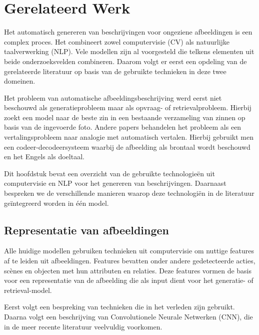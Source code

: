 \chapter{Gerelateerd Werk}
\label{hoofdstuk:related}
Het automatisch genereren van beschrijvingen voor ongeziene afbeeldingen is een complex proces. Het combineert zowel computervisie (CV) als natuurlijke taalverwerking (NLP). Vele modellen zijn al voorgesteld die telkens elementen uit beide onderzoeksvelden combineren. Daarom volgt er eerst een opdeling van de gerelateerde literatuur op basis van de gebruikte technieken in deze twee domeinen. 

Het probleem van automatische afbeeldingsbeschrijving werd eerst niet beschouwd als generatieprobleem maar als opvraag- of retrievalprobleem. Hierbij zoekt een model naar de beste zin in een bestaande verzameling van zinnen op basis van de ingevoerde foto\cite{Hodosh2013}. Andere papers behandelen het probleem als een vertalingsprobleem naar analogie met automatisch vertalen. Hierbij gebruikt men een codeer-decodeersysteem waarbij de afbeelding als brontaal wordt beschouwd en het Engels als doeltaal.

Dit hoofdstuk bevat een overzicht van de gebruikte technologie\"en uit computervisie en NLP voor het genereren van beschrijvingen. Daarnaast bespreken we de verschillende manieren waarop deze technologi\"en in de literatuur ge\"integreerd worden in \'e\'en model.

\section{Representatie van afbeeldingen}
Alle huidige modellen gebruiken technieken uit computervisie om nuttige features af te leiden uit afbeeldingen. Features bevatten onder andere gedetecteerde acties, sc\`enes en objecten met hun attributen en relaties\cite{Bernardi}. Deze features vormen de basis voor een representatie van de afbeelding die als input dient voor het generatie- of retrieval-model.

Eerst volgt een bespreking van technieken die in het verleden zijn gebruikt. Daarna volgt een beschrijving van Convolutionele Neurale Netwerken (CNN), die in de meer recente literatuur veelvuldig voorkomen.


